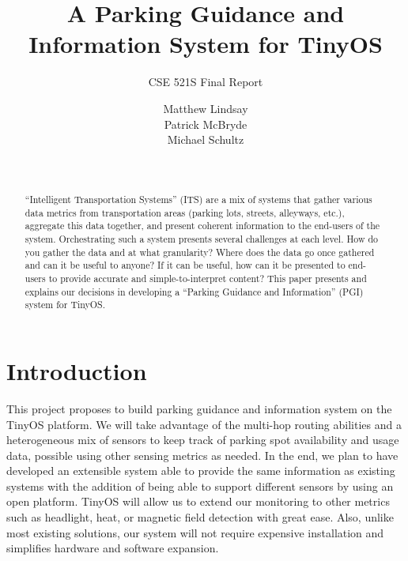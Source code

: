 \documentclass{acm_proc}
\begin{document}
\title{A Parking Guidance and Information System for TinyOS}
\subtitle{CSE 521S Final Report}

\author{
\alignauthor Matthew Lindsay\\
\alignauthor Patrick McBryde\\
\alignauthor Michael Schultz\\
\and
{}\\
}

\maketitle

\begin{abstract}
``Intelligent Transportation Systems'' (ITS) are a mix of systems that
gather various data metrics from transportation areas (parking lots,
streets, alleyways, etc.), aggregate this data together, and present
coherent information to the end-users of the system.
Orchestrating such a system presents several challenges at each level.
How do you gather the data and at what granularity?
Where does the data go once gathered and can it be useful to anyone?
If it can be useful, how can it be presented to end-users to provide
accurate and simple-to-interpret content?
This paper presents and explains our decisions in developing a ``Parking
Guidance and Information'' (PGI) system for TinyOS.
\end{abstract}

\section{Introduction}

This project proposes to build parking guidance and information system on
the
TinyOS platform.
We will take advantage of the multi-hop routing abilities and a
heterogeneous
mix of sensors to keep track of parking spot availability and usage data,
possible using other sensing metrics as needed.
In the end, we plan to have developed an extensible system able to provide
the
same information as existing systems with the addition of being able to
support different sensors by using an open platform.
TinyOS will allow us to extend our monitoring to other metrics such as
headlight, heat, or magnetic field detection with great ease.
Also, unlike most existing solutions, our system will not require expensive
installation and simplifies hardware and software expansion.
\end{document}
